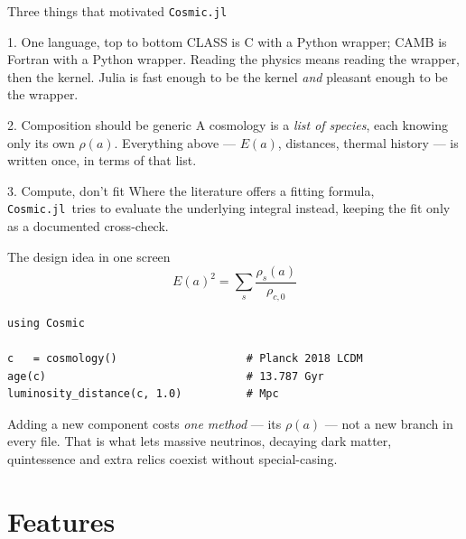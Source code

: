 \documentclass[10pt,aspectratio=43]{beamer}
\newcommand{\Cosmic}{\textcolor{cdeep}{\texttt{Cosmic.jl}}}
\begin{document}
\begin{frame}{Three things that motivated \Cosmic}
  \begin{block}{1. One language, top to bottom}
    CLASS is C with a Python wrapper; CAMB is Fortran with a Python wrapper.
    Reading the physics means reading the wrapper, then the kernel. Julia is
    fast enough to be the kernel \emph{and} pleasant enough to be the wrapper.
  \end{block}
  \begin{block}{2. Composition should be generic}
    A cosmology is a \emph{list of species}, each knowing only its own
    $\rho(a)$. Everything above --- $E(a)$, distances, thermal history --- is
    written once, in terms of that list.
  \end{block}
  \begin{block}{3. Compute, don't fit}
    Where the literature offers a fitting formula, \Cosmic\ tries to evaluate
    the underlying integral instead, keeping the fit only as a documented
    cross-check.
  \end{block}
\end{frame}

\begin{frame}[fragile]{The design idea in one screen}
\[
  E(a)^2=\sum_s \frac{\rho_s(a)}{\rho_{c,0}}
\]
\begin{lstlisting}
using Cosmic

c   = cosmology()                    # Planck 2018 LCDM
age(c)                               # 13.787 Gyr
luminosity_distance(c, 1.0)          # Mpc
\end{lstlisting}
\vfill
Adding a new component costs \emph{one method} --- its $\rho(a)$ --- not a new
branch in every file. That is what lets massive neutrinos, decaying dark
matter, quintessence and extra relics coexist without special-casing.
\end{frame}

\section{Features}
\end{document}
